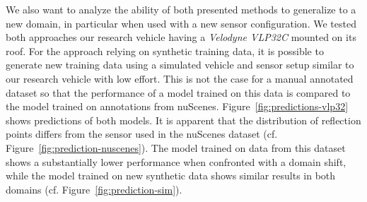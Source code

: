 \documentclass[conference]{IEEEtran}
\begin{document}
We also want to analyze the ability of both presented methods to generalize to a new domain, in particular when used with a new sensor configuration. We tested both approaches our research vehicle having a \textit{Velodyne VLP32C} mounted on its roof. For the approach relying on synthetic training data, it is possible to generate new training data using a simulated vehicle and sensor setup similar to our research vehicle with low effort. This is not the case for a manual annotated dataset so that the performance of a model trained on this data is compared to the model trained on annotations from nuScenes. Figure~\ref{fig:predictions-vlp32} shows predictions of both models. It is apparent that the distribution of reflection points differs from the sensor used in the nuScenes dataset (cf. Figure~\ref{fig:prediction-nuscenes}). The model trained on data from this dataset shows a substantially lower performance when confronted with a domain shift, while the model trained on new synthetic data shows similar results in both domains (cf. Figure~\ref{fig:prediction-sim}).
\end{document}
